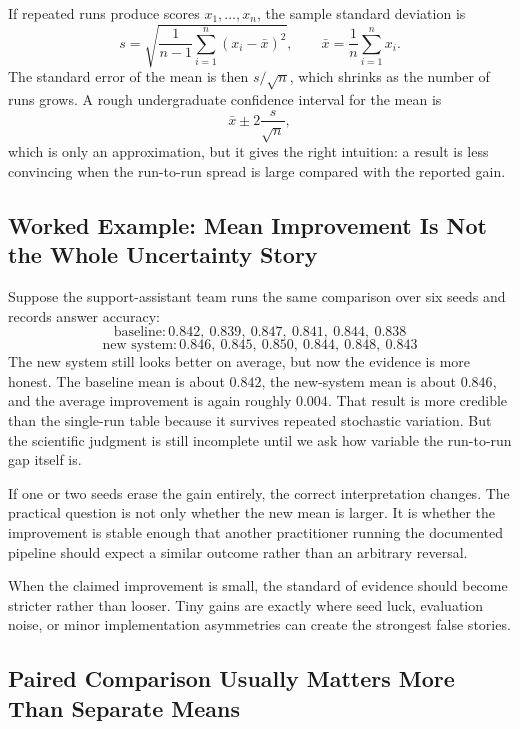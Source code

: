 \begin{mathlens}
If repeated runs produce scores \(x_1,\dots,x_n\), the sample standard deviation is
\[
s=\sqrt{\frac{1}{n-1}\sum_{i=1}^n (x_i-\bar{x})^2},
\qquad
\bar{x}=\frac{1}{n}\sum_{i=1}^n x_i.
\]
The standard error of the mean is then \(s/\sqrt{n}\), which shrinks as the number of runs grows. A rough undergraduate confidence interval for the mean is
\[
\bar{x}\pm 2\frac{s}{\sqrt{n}},
\]
which is only an approximation, but it gives the right intuition: a result is less convincing when the run-to-run spread is large compared with the reported gain.
\end{mathlens}

\subsection{Worked Example: Mean Improvement Is Not the Whole Uncertainty Story}

Suppose the support-assistant team runs the same comparison over six seeds and records answer accuracy:
\[
\text{baseline}: 0.842,\ 0.839,\ 0.847,\ 0.841,\ 0.844,\ 0.838
\]
\[
\text{new system}: 0.846,\ 0.845,\ 0.850,\ 0.844,\ 0.848,\ 0.843
\]
The new system still looks better on average, but now the evidence is more honest. The baseline mean is about $0.842$, the new-system mean is about $0.846$, and the average improvement is again roughly $0.004$. That result is more credible than the single-run table because it survives repeated stochastic variation. But the scientific judgment is still incomplete until we ask how variable the run-to-run gap itself is.

If one or two seeds erase the gain entirely, the correct interpretation changes. The practical question is not only whether the new mean is larger. It is whether the improvement is stable enough that another practitioner running the documented pipeline should expect a similar outcome rather than an arbitrary reversal.

\begin{practicalnote}
When the claimed improvement is small, the standard of evidence should become stricter rather than looser. Tiny gains are exactly where seed luck, evaluation noise, or minor implementation asymmetries can create the strongest false stories.
\end{practicalnote}

\subsection{Paired Comparison Usually Matters More Than Separate Means}


